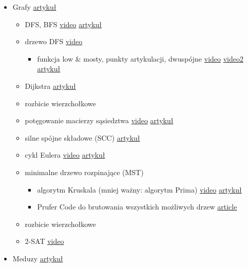 \documentclass[15pt]{article}
\begin{document}
\begin{itemize}
\begin{itemize}
        \item Grafy \href{http://kompendium.meetit.pl/kurs#graph1}{artykuł}
        \begin{itemize}
            \item DFS, BFS \href{http://was.zaa.mimuw.edu.pl/?q=node/31}{video} \href{http://kompendium.meetit.pl/kurs#graph1}{artykuł}
            \item drzewo DFS \href{http://was.zaa.mimuw.edu.pl/?q=node/33}{video}
            \begin{itemize}
                \item funkcja low \& mosty, punkty artykulacji, dwuspójne \href{http://solve.edu.pl/~sparingi/resources}{video} \href{http://was.zaa.mimuw.edu.pl/?q=node/39}{video2} \href{http://kompendium.meetit.pl/kurs#graph7}{artykuł}
            \end{itemize}
            \item Dijkstra \href{http://kompendium.meetit.pl/kurs#graph2}{artykuł}
            \item rozbicie wierzchołkowe
            \item potęgowanie macierzy sąsiedztwa \href{http://was.zaa.mimuw.edu.pl/?q=node/35}{video} \href{http://kompendium.meetit.pl/kurs#dp5}{artykuł}
            \item silne spójne składowe (SCC) \href{http://kompendium.meetit.pl/kurs#graphB}{artykuł}
            \item cykl Eulera \href{http://was.zaa.mimuw.edu.pl/?q=node/31}{video} \href{http://kompendium.meetit.pl/kurs#graph1}{artykuł}
            \item minimalne drzewo rozpinające (MST)
            \begin{itemize}
                \item algorytm Kruskala (mniej ważny: algorytm Prima) \href{http://was.zaa.mimuw.edu.pl/?q=node/39}{video} \href{http://kompendium.meetit.pl/kurs#graph7}{artykuł} 
                \item Prufer Code do brutowania wszystkich możliwych drzew \href{https://cp-algorithms.com/graph/pruefer_code.html}{article}
            \end{itemize}
            \item rozbicie wierzchołkowe 
            \item 2-SAT \href{http://solve.edu.pl/~sparingi/resources}{video}
        \end{itemize}
        
        \item Meduzy \href{http://kompendium.meetit.pl/kurs#graph8}{artykuł}
        

\end{itemize}
\end{itemize}
\end{document}
